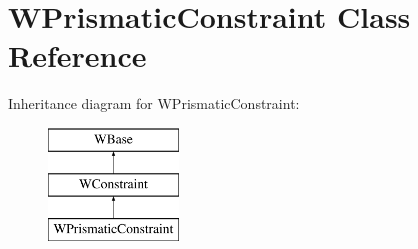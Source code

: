 \hypertarget{class_w_prismatic_constraint}{}\section{W\+Prismatic\+Constraint Class Reference}
\label{class_w_prismatic_constraint}
Inheritance diagram for W\+Prismatic\+Constraint\+:\begin{figure}[H]
\begin{center}
\leavevmode
\includegraphics[height=3.000000cm]{class_w_prismatic_constraint}
\end{center}
\end{figure}
